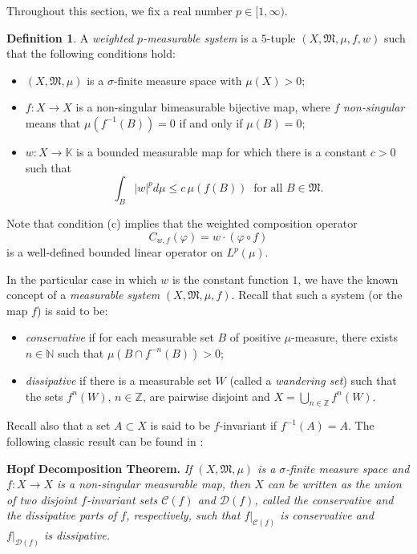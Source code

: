 \documentclass[12pt]{article}
\theoremstyle{plain}
\theoremstyle{definition}
\newtheorem{definition}[theorem]{Definition}%
\newcommand{\N}{\mathbb{N}} %
\newcommand{\Z}{\mathbb{Z}} %
\newcommand{\K}{\mathbb{K}} %
\newcommand{\cC}{\mathcal{C}}
\newcommand{\cD}{\mathcal{D}}
\newcommand{\fM}{\mathfrak{M}}
\begin{document}
Throughout this section, we fix a real number $p \in [1,\infty)$.

\begin{definition}\label{Dis-D1}
A {\em weighted $p$-measurable system} is a $5$-tuple $(X,\fM,\mu,f,w)$ such that the following conditions hold:
\begin{itemize}
\item [(a)] $(X,\fM,\mu)$ is a $\sigma$-finite measure space with $\mu(X) > 0$;
\item [(b)] $f : X \to X$ is a non-singular bimeasurable bijective map, 
  where $f$ {\em non-singular} means that $\mu(f^{-1}(B)) = 0$ if and only if $\mu(B) = 0$;
\item [(c)] $w : X \to \K$ is a bounded measurable map for which there is a constant $c > 0$ such that
  \[
  \int_B |w|^p d\mu \leq c\, \mu(f(B)) \ \text{ for all } B \in \fM.
  \]
\end{itemize}
\end{definition}

Note that condition (c) implies that the weighted composition operator 
\[
C_{w,f}(\varphi) = w \cdot (\varphi \circ f)
\]
is a well-defined bounded linear operator on $L^p(\mu)$.

In the particular case in which $w$ is the constant function $1$, 
we have the known concept of a {\em measurable system} $(X,\fM,\mu,f)$.
Recall that such a system (or the map $f$) is said to be:
\begin{itemize}
\item {\em conservative} if for each measurable set $B$ of positive $\mu$-measure, there exists $n \in \N$ such that 
  $\mu(B \cap f^{-n}(B)) > 0$;
\item {\em dissipative} if there is a measurable set $W$ (called a {\em wandering set}) such that the sets $f^n(W)$, $n \in \Z$, 
  are pairwise disjoint and $X = \bigcup_{n \in \Z} f^n(W)$. 
\end{itemize}
Recall also that a set $A \subset  X$ is said to be $f$-invariant if $ f^{-1}(A) = A$. 
The following classic result can be found in \cite[Theorem 3.2]{UKre85}:

\medskip\noindent
{\bf Hopf Decomposition Theorem.}  {\it If $(X,\fM,\mu)$ is a $\sigma$-finite measure space and $f : X \to X$ is a non-singular
measurable map, then $X$ can be written as the union of two disjoint $f$-invariant sets $\cC(f)$ and $\cD(f)$, 
called the {\em conservative} and the {\em dissipative parts} of $f$, respectively, such that 
$f|_{\cC(f)}$ is conservative and $f|_{\cD(f)}$ is dissipative.}
\end{document}

